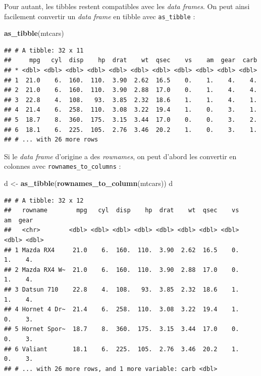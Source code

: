 \documentclass[]{book}
\newenvironment{Shaded}{\begin{snugshade}}{\end{snugshade}}
\newcommand{\KeywordTok}[1]{\textcolor[rgb]{0.13,0.29,0.53}{\textbf{#1}}}
\newcommand{\StringTok}[1]{\textcolor[rgb]{0.31,0.60,0.02}{#1}}
\newcommand{\NormalTok}[1]{#1}
\begin{document}
Pour autant, les tibbles restent compatibles avec les \emph{data
frames}. On peut ainsi facilement convertir un \emph{data frame} en
tibble avec \texttt{as\_tibble} :

\begin{Shaded}
\begin{Highlighting}[]
\KeywordTok{as_tibble}\NormalTok{(mtcars)}
\end{Highlighting}
\end{Shaded}

\begin{verbatim}
## # A tibble: 32 x 11
##     mpg   cyl  disp    hp  drat    wt  qsec    vs    am  gear  carb
## * <dbl> <dbl> <dbl> <dbl> <dbl> <dbl> <dbl> <dbl> <dbl> <dbl> <dbl>
## 1  21.0    6.  160.  110.  3.90  2.62  16.5    0.    1.    4.    4.
## 2  21.0    6.  160.  110.  3.90  2.88  17.0    0.    1.    4.    4.
## 3  22.8    4.  108.   93.  3.85  2.32  18.6    1.    1.    4.    1.
## 4  21.4    6.  258.  110.  3.08  3.22  19.4    1.    0.    3.    1.
## 5  18.7    8.  360.  175.  3.15  3.44  17.0    0.    0.    3.    2.
## 6  18.1    6.  225.  105.  2.76  3.46  20.2    1.    0.    3.    1.
## # ... with 26 more rows
\end{verbatim}

Si le \emph{data frame} d'origine a des \emph{rownames}, on peut d'abord
les convertir en colonnes avec \texttt{rownames\_to\_columns} :

\begin{Shaded}
\begin{Highlighting}[]
\NormalTok{d <-}\StringTok{ }\KeywordTok{as_tibble}\NormalTok{(}\KeywordTok{rownames_to_column}\NormalTok{(mtcars))}
\NormalTok{d}
\end{Highlighting}
\end{Shaded}

\begin{verbatim}
## # A tibble: 32 x 12
##   rowname        mpg   cyl  disp    hp  drat    wt  qsec    vs    am  gear
##   <chr>        <dbl> <dbl> <dbl> <dbl> <dbl> <dbl> <dbl> <dbl> <dbl> <dbl>
## 1 Mazda RX4     21.0    6.  160.  110.  3.90  2.62  16.5    0.    1.    4.
## 2 Mazda RX4 W~  21.0    6.  160.  110.  3.90  2.88  17.0    0.    1.    4.
## 3 Datsun 710    22.8    4.  108.   93.  3.85  2.32  18.6    1.    1.    4.
## 4 Hornet 4 Dr~  21.4    6.  258.  110.  3.08  3.22  19.4    1.    0.    3.
## 5 Hornet Spor~  18.7    8.  360.  175.  3.15  3.44  17.0    0.    0.    3.
## 6 Valiant       18.1    6.  225.  105.  2.76  3.46  20.2    1.    0.    3.
## # ... with 26 more rows, and 1 more variable: carb <dbl>
\end{verbatim}
\end{document}
